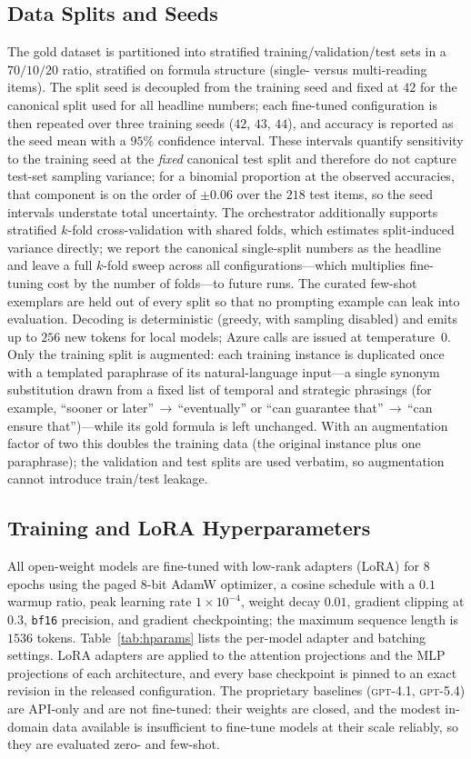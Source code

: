 \documentclass[letterpaper]{article}
\begin{document}
\subsection{Data Splits and Seeds}
The gold dataset is partitioned into stratified training/validation/test sets in a $70/10/20$ ratio, stratified on formula structure (single- versus multi-reading items). The split seed is decoupled from the training seed and fixed at $42$ for the canonical split used for all headline numbers; each fine-tuned configuration is then repeated over three training seeds ($42$, $43$, $44$), and accuracy is reported as the seed mean with a $95\%$ confidence interval. These intervals quantify sensitivity to the training seed at the \emph{fixed} canonical test split and therefore do not capture test-set sampling variance; for a binomial proportion at the observed accuracies, that component is on the order of $\pm0.06$ over the $218$ test items, so the seed intervals understate total uncertainty. The orchestrator additionally supports stratified $k$-fold cross-validation with shared folds, which estimates split-induced variance directly; we report the canonical single-split numbers as the headline and leave a full $k$-fold sweep across all configurations---which multiplies fine-tuning cost by the number of folds---to future runs. The curated few-shot exemplars are held out of every split so that no prompting example can leak into evaluation. Decoding is deterministic (greedy, with sampling disabled) and emits up to $256$ new tokens for local models; Azure calls are issued at temperature~$0$. Only the training split is augmented: each training instance is duplicated once with a templated paraphrase of its natural-language input---a single synonym substitution drawn from a fixed list of temporal and strategic phrasings (for example, ``sooner or later''\,$\rightarrow$\,``eventually'' or ``can guarantee that''\,$\rightarrow$\,``can ensure that'')---while its gold formula is left unchanged. With an augmentation factor of two this doubles the training data (the original instance plus one paraphrase); the validation and test splits are used verbatim, so augmentation cannot introduce train/test leakage.

\subsection{Training and LoRA Hyperparameters}
All open-weight models are fine-tuned with low-rank adapters (LoRA) for $8$ epochs using the paged $8$-bit AdamW optimizer, a cosine schedule with a $0.1$ warmup ratio, peak learning rate $1\times10^{-4}$, weight decay $0.01$, gradient clipping at $0.3$, \texttt{bf16} precision, and gradient checkpointing; the maximum sequence length is $1536$ tokens. Table~\ref{tab:hparams} lists the per-model adapter and batching settings. LoRA adapters are applied to the attention projections and the MLP projections of each architecture, and every base checkpoint is pinned to an exact revision in the released configuration. The proprietary baselines (\textsc{gpt-4.1}, \textsc{gpt-5.4}) are API-only and are not fine-tuned: their weights are closed, and the modest in-domain data available is insufficient to fine-tune models at their scale reliably, so they are evaluated zero- and few-shot.
\end{document}
